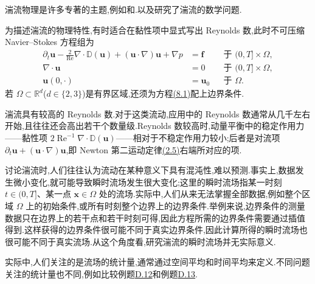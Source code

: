\begin{note}[相关专著]
\label{note:turbulence-monographs}
湍流物理是许多专著的主题,例如\textcite{Pope2000}和\textcite{Davidson2004}.\textcite{FoiasManleyRosaTemam2001}以及\textcite{ChaconRebolloLewandowski2014}研究了湍流的数学问题.
\end{note}

\begin{note}
\label{note:turbulent-navier-stokes-equations}
为描述湍流的物理特性,有时适合在黏性项中显式写出 Reynolds 数,此时不可压缩 Navier--Stokes 方程组为
\begin{equation}\label{eq:turbulent-navier-stokes}
\begin{aligned}
 \partial_t\bm{u}
 -\frac{2}{\operatorname{Re}}\nabla\cdot\mathbb{D}(\bm{u})
 +(\bm{u}\cdot\nabla)\bm{u}+\nabla p
   &=\bm{f}
      &&\text{于 }(0,T]\times\Omega,\\
 \nabla\cdot\bm{u}&=0
      &&\text{于 }(0,T]\times\Omega,\\
 \bm{u}(0,\cdot)&=\bm{u}_0
      &&\text{于 }\Omega.
\end{aligned}
\end{equation}
若 $\Omega\subset\mathbb{R}^d$($d\in\{2,3\}$)是有界区域,还须为方程\hyperref[eq:turbulent-navier-stokes]{(8.1)}配上边界条件.

湍流具有较高的 Reynolds 数.对于这类流动,应用中的 Reynolds 数通常从几千左右开始,且往往还会高出若干个数量级.Reynolds 数较高时,动量平衡中的稳定作用力——黏性项 $2\operatorname{Re}^{-1}\nabla\cdot\mathbb{D}(\bm{u})$——相对于不稳定作用力较小;后者是对流项 $\partial_t\bm{u}+(\bm{u}\cdot\nabla)\bm{u}$,即 Newton 第二运动定律\hyperref[eq:newton-second-law]{(2.5)}右端所对应的项.
\end{note}

\begin{note}[瞬时流动与统计量]
\label{note:turbulent-instantaneous-flow-statistics}
讨论湍流时,人们往往认为流动在某种意义下具有混沌性,难以预测.事实上,数据发生微小变化,就可能导致瞬时流场发生很大变化;这里的瞬时流场指某一时刻 $t\in(0,T]$、某一点 $\bm{x}\in\Omega$ 处的流场.实际中,人们从来无法掌握全部数据,例如整个区域 $\Omega$ 上的初始条件,或所有时刻整个边界上的边界条件.举例来说,边界条件的测量数据只在边界上的若干点和若干时刻可得,因此方程所需的边界条件需要通过插值得到.这样获得的边界条件很可能不同于真实边界条件,因此计算所得的瞬时流场也很可能不同于真实流场.从这个角度看,研究湍流的瞬时流场并无实际意义.

实际中,人们关注的是流场的统计量,通常通过空间平均和时间平均来定义.不同问题关注的统计量也不同,例如比较例题\hyperref[ex:appendix-d-12]{D.12}和例题\hyperref[ex:appendix-d-13]{D.13}.
\end{note}

